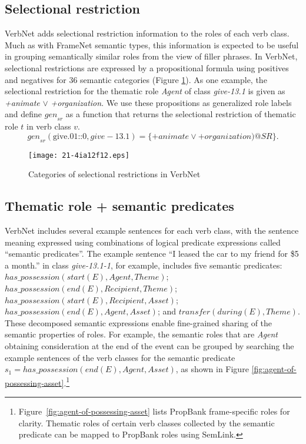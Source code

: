 \documentclass[english]{jnlp_1.4_rep}
\begin{document}
\subsection{Selectional restriction}
\label{sec:selectional-restriction}

VerbNet adds selectional restriction information to the roles of each verb class. Much as with FrameNet semantic types, this information is expected to be useful in grouping semantically similar roles from the view of filler phrases. In VerbNet, selectional restrictions are expressed by a propositional formula using positives and negatives for 36 semantic categories (Figure \ref{fig:selectional-restriction-list}). As one example, the selectional restriction for the thematic role {\it Agent} of class {\it give-13.1} is given as {\it +animate} $\vee$ {\it +organization}. We use these propositions as generalized role labels and define $\mathit{gen}_\mathit{sr}$ as a function that returns the selectional restriction of thematic role $t$ in verb class $v$.
\begin{equation}
\mathit{gen}_\mathit{sr}(\mbox{give.01::0},\mathit{give-13.1}) = \{ \mathit{+animate}\vee \mathit{+organization})@\mathit{SR} \}.
\end{equation}

\begin{figure}[b]
\begin{center}
\texttt{[image: 21-4ia12f12.eps]}
\end{center}
\caption{Categories of selectional restrictions in VerbNet}
\label{fig:selectional-restriction-list}
\end{figure}


\subsection{Thematic role + semantic predicates}

VerbNet includes several example sentences for each verb class, with the sentence meaning expressed using combinations of logical predicate expressions called ``semantic predicates''. The example sentence ``I leased the car to my friend for \$5 a month.'' in class {\it give-13.1-1}, for example, includes five semantic predicates:
$has\_possession(start(E), Agent, Theme)$;\\
$has\_possession(end(E), Recipient, Theme)$;
$has\_possession(start(E), Recipient, Asset)$;\\
$has\_possession(end(E), Agent, Asset)$;
and $transfer(during(E), Theme)$.
These decomposed semantic expressions enable fine-grained sharing of the semantic properties of roles. 
\pagebreak
For example, the semantic roles that are {\it Agent} obtaining consideration at the end of the event can be grouped by searching the example sentences of the verb classes for the semantic predicate $s_1 = has\_possession(end(E), Agent, Asset)$, as shown in Figure \ref{fig:agent-of-possessing-asset}.\footnote{Figure~\ref{fig:agent-of-possessing-asset} lists PropBank frame-specific roles for clarity. Thematic roles of certain verb classes collected by the semantic predicate can be mapped to PropBank roles using SemLink.}
\end{document}
